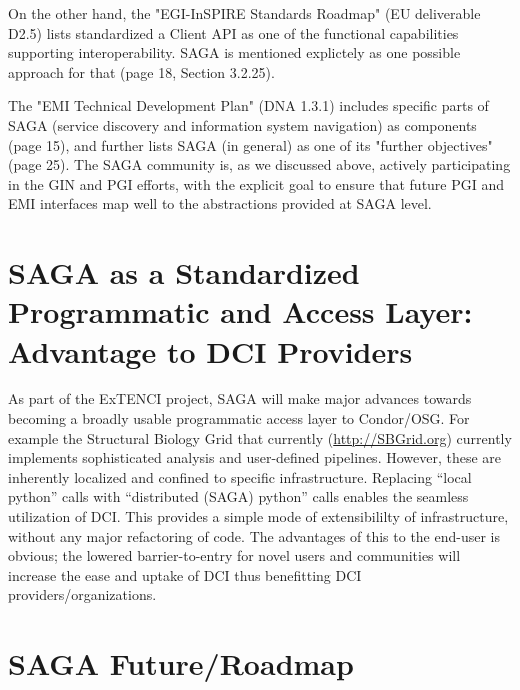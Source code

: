 \documentclass[12pt]{article}
\begin{document}
 On the other hand, the "EGI-InSPIRE Standards Roadmap" (EU
 deliverable D2.5) lists standardized a Client API as one of the
 functional capabilities supporting interoperability.  SAGA is
 mentioned explictely as one possible approach for that (page 18,
 Section 3.2.25).

 The "EMI Technical Development Plan" (DNA 1.3.1) includes specific
 parts of SAGA (service discovery and information system navigation)
 as components (page 15), and further lists SAGA (in general) as one
 of its "further objectives" (page 25).  The SAGA community is, as we
 discussed above, actively participating in the GIN and PGI efforts,
 with the explicit goal to ensure that future PGI and EMI interfaces
 map well to the abstractions provided at SAGA level.



\section{SAGA as a Standardized Programmatic and Access Layer:
  Advantage to DCI Providers}

As part of the ExTENCI project, SAGA will make major advances towards
becoming a broadly usable programmatic access layer to Condor/OSG.
For example the Structural Biology Grid that currently
(\url{http://SBGrid.org}) currently implements sophisticated analysis
and user-defined pipelines. However, these are inherently localized
and confined to specific infrastructure.  Replacing ``local python''
calls with ``distributed (SAGA) python'' calls enables the seamless
utilization of DCI. This provides a simple mode of extensibililty of
infrastructure, without any major refactoring of code. The advantages
of this to the end-user is obvious; the lowered barrier-to-entry for
novel users and communities will increase the ease and uptake of DCI
thus benefitting DCI providers/organizations.

\section{SAGA Future/Roadmap}



\end{document}
